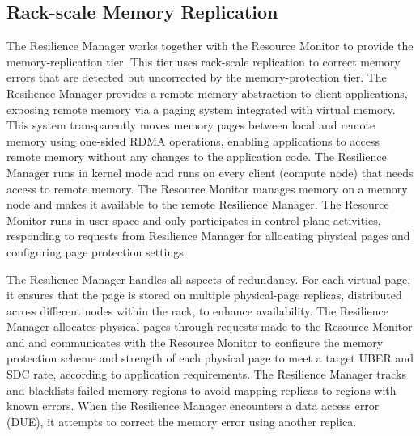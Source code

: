 \subsection{Rack-scale Memory Replication}

The Resilience Manager works together with the Resource Monitor to provide the memory-replication tier. This tier uses rack-scale replication to correct memory errors that are detected but uncorrected by the memory-protection tier. 
The Resilience Manager provides a remote memory abstraction to client applications, exposing remote memory via a paging system integrated with virtual memory. 
This system transparently moves memory pages between local and remote memory using one-sided RDMA operations, enabling applications to access remote memory without any changes to the application code. 
The Resilience Manager runs in kernel mode and runs on every client (compute node) that needs access to remote memory.  
The Resource Monitor manages memory on a memory node and makes it available to the remote Resilience Manager. 
The Resource Monitor runs in user space and only participates in control-plane activities, responding to requests from Resilience Manager for allocating physical pages and configuring page protection settings.

The Resilience Manager handles all aspects of redundancy. 
For each virtual page, it ensures that the page is stored on multiple physical-page replicas, distributed across different nodes within the rack, to enhance availability. 
The Resilience Manager allocates physical pages through requests made to the Resource Monitor and 
and communicates with the Resource Monitor to configure the memory protection scheme and strength of each physical page to meet a target UBER and SDC rate, according to application requirements.
The Resilience Manager tracks and blacklists failed memory regions to avoid mapping replicas to regions with known errors. When the Resilience Manager encounters a data access error (DUE), it attempts to correct the memory error using another replica.



